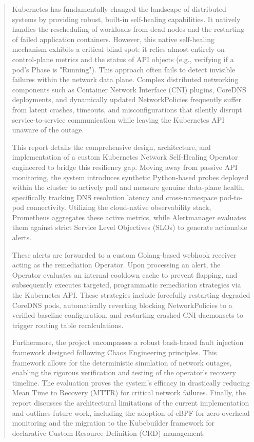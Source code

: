 \documentclass[12pt,a4paper]{article}
\begin{document}
\begin{abstract}
\onehalfspacing
Kubernetes has fundamentally changed the landscape of distributed systems by providing robust, built-in self-healing capabilities. It natively handles the rescheduling of workloads from dead nodes and the restarting of failed application containers. However, this native self-healing mechanism exhibits a critical blind spot: it relies almost entirely on control-plane metrics and the status of API objects (e.g., verifying if a pod's Phase is "Running"). This approach often fails to detect invisible failures within the network data plane. Complex distributed networking components such as Container Network Interface (CNI) plugins, CoreDNS deployments, and dynamically updated NetworkPolicies frequently suffer from latent crashes, timeouts, and misconfigurations that silently disrupt service-to-service communication while leaving the Kubernetes API unaware of the outage.

This report details the comprehensive design, architecture, and implementation of a custom Kubernetes Network Self-Healing Operator engineered to bridge this resiliency gap. Moving away from passive API monitoring, the system introduces synthetic Python-based probes deployed within the cluster to actively poll and measure genuine data-plane health, specifically tracking DNS resolution latency and cross-namespace pod-to-pod connectivity. Utilizing the cloud-native observability stack, Prometheus aggregates these active metrics, while Alertmanager evaluates them against strict Service Level Objectives (SLOs) to generate actionable alerts.

These alerts are forwarded to a custom Golang-based webhook receiver acting as the remediation Operator. Upon processing an alert, the Operator evaluates an internal cooldown cache to prevent flapping, and subsequently executes targeted, programmatic remediation strategies via the Kubernetes API. These strategies include forcefully restarting degraded CoreDNS pods, automatically reverting blocking NetworkPolicies to a verified baseline configuration, and restarting crashed CNI daemonsets to trigger routing table recalculations. 

Furthermore, the project encompasses a robust bash-based fault injection framework designed following Chaos Engineering principles. This framework allows for the deterministic simulation of network outages, enabling the rigorous verification and testing of the operator's recovery timeline. The evaluation proves the system's efficacy in drastically reducing Mean Time to Recovery (MTTR) for critical network failures. Finally, the report discusses the architectural limitations of the current implementation and outlines future work, including the adoption of eBPF for zero-overhead monitoring and the migration to the Kubebuilder framework for declarative Custom Resource Definition (CRD) management.
\end{abstract}
\end{document}
